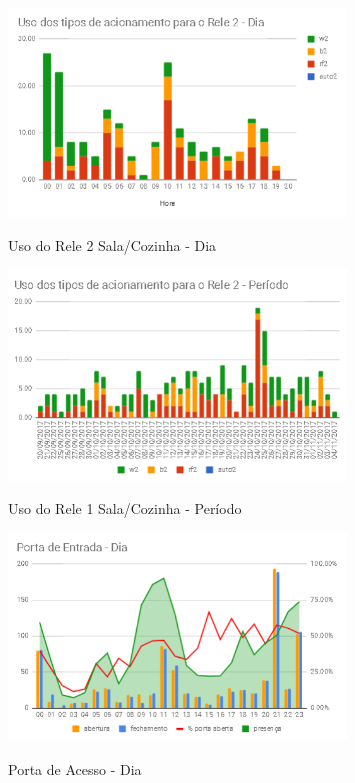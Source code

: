 \begin{figure}[H]
	\centering
	\caption{Uso do Rele 2 Sala/Cozinha - Dia}
	\includegraphics[width=0.8\textwidth]{usorele2salacozinhadia}
	\label{fig:usorele2salacozinhadia}
\end{figure}

\begin{figure}[H]
	\centering
	\caption{Uso do Rele 1 Sala/Cozinha - Período}
	\includegraphics[width=0.8\textwidth]{usorele2salacozinhaperiodo}
	\label{fig:usorele2salacozinhaperiodo}
\end{figure}

\begin{figure}[H]
	\centering
	\caption{Porta de Acesso - Dia}
	\includegraphics[width=0.8\textwidth]{portaentradadia}
	\label{fig:portaentradadia}
\end{figure}


